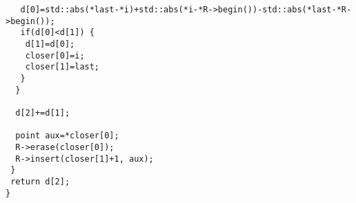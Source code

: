 \documentclass[a4paper, 12pt]{article}
\begin{document}
{\begin{verbatim}
   d[0]=std::abs(*last-*i)+std::abs(*i-*R->begin())-std::abs(*last-*R->begin());                                                                                
   if(d[0]<d[1]) {                                                                                                                                              
    d[1]=d[0];                                                                                                                                                  
    closer[0]=i;                                                                                                                                                
    closer[1]=last;                                                                                                                                             
   }                                                                                                                                                            
  }                                                                                                                                                             
                                                                                                                                                                
  d[2]+=d[1];                                                                                                                                                   
                                                                                                                                                                
  point aux=*closer[0];                                                                                                                                         
  R->erase(closer[0]);                                                                                                                                          
  R->insert(closer[1]+1, aux);                                                                                                                                  
 }                                                                                                                                                              
 return d[2];                                                                                                                                                   
}  
\end{verbatim}
}

\newpage
\end{document}
